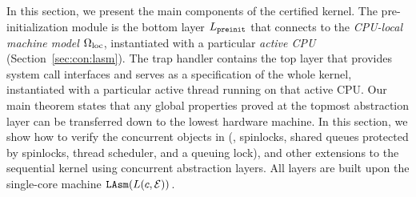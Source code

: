 
In this section, we present the main components of the certified {\cCTOS} kernel. 
The pre-initialization module is the bottom layer $L_{\texttt{preinit}}$
that connects to the
 \emph{CPU-local machine model} $\Omega_{\text{loc}}$, instantiated with a 
 particular \emph{active CPU} (\cf Section~\ref{sec:con:lasm}).
The trap handler contains the top layer that provides system call interfaces
and serves as a specification of the whole kernel,
instantiated with a particular active thread
running on that active CPU.
Our main theorem states that any global properties proved at the topmost
abstraction layer can be transferred down to the lowest hardware machine.
In this section, we show
how to verify 
the concurrent objects in \cCTOS{}
(\ie, spinlocks, shared queues protected by spinlocks,
thread scheduler, and a queuing lock),
and other extensions to the sequential
kernel \mCTOS{}
using concurrent abstraction layers.
All layers are built upon the single-core machine ${\texttt{LAsm}}{(L(c,\mathcal{E}))}$.

